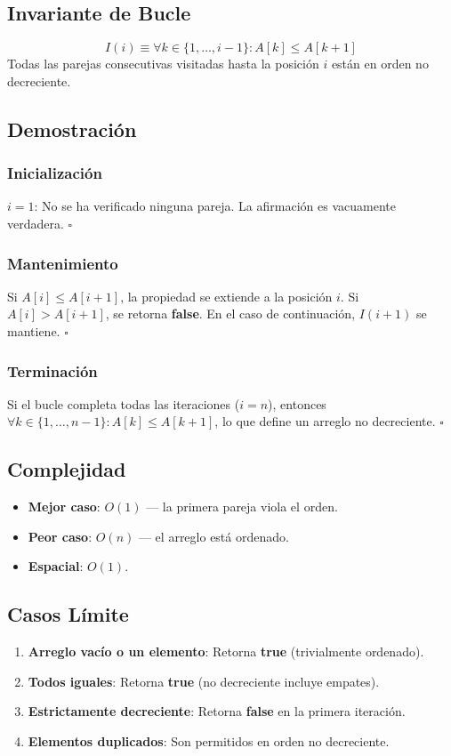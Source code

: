 \documentclass[11pt,a4paper]{article}
\newcommand{\inv}{I}
\begin{document}
\subsection{Invariante de Bucle}
\[
\boxed{\inv(i) \equiv \forall k \in \{1, \ldots, i-1\}: A[k] \leq A[k+1]}
\]
Todas las parejas consecutivas visitadas hasta la posición $i$ están en orden no decreciente.

\subsection{Demostración}

\subsubsection{Inicialización}
$i = 1$: No se ha verificado ninguna pareja. La afirmación es vacuamente verdadera. $\square$

\subsubsection{Mantenimiento}
Si $A[i] \leq A[i+1]$, la propiedad se extiende a la posición $i$. Si $A[i] > A[i+1]$, se retorna \textbf{false}. En el caso de continuación, $\inv(i+1)$ se mantiene. $\square$

\subsubsection{Terminación}
Si el bucle completa todas las iteraciones ($i = n$), entonces $\forall k \in \{1, \ldots, n-1\}: A[k] \leq A[k+1]$, lo que define un arreglo no decreciente. $\square$

\subsection{Complejidad}
\begin{itemize}
    \item \textbf{Mejor caso}: $O(1)$ --- la primera pareja viola el orden.
    \item \textbf{Peor caso}: $O(n)$ --- el arreglo está ordenado.
    \item \textbf{Espacial}: $O(1)$.
\end{itemize}

\subsection{Casos Límite}
\begin{enumerate}
    \item \textbf{Arreglo vacío o un elemento}: Retorna \textbf{true} (trivialmente ordenado).
    \item \textbf{Todos iguales}: Retorna \textbf{true} (no decreciente incluye empates).
    \item \textbf{Estrictamente decreciente}: Retorna \textbf{false} en la primera iteración.
    \item \textbf{Elementos duplicados}: Son permitidos en orden no decreciente.
\end{enumerate}
\end{document}
